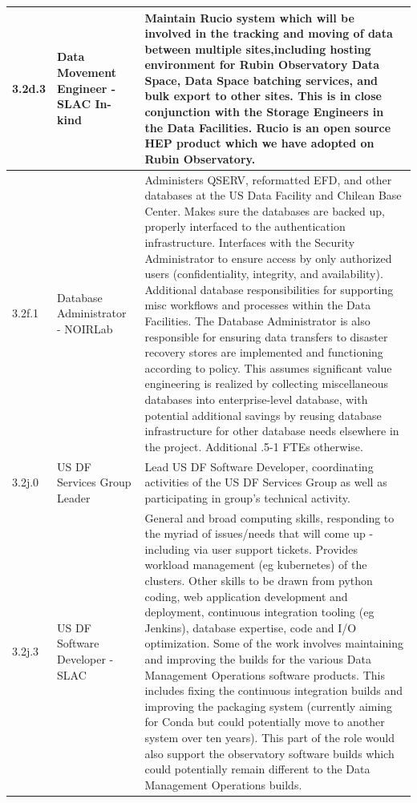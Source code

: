 \begin{longtable} {|p{}|p{}|p{}|}
{3.2d.3}&{Data Movement Engineer - SLAC In-kind}&{Maintain Rucio system which will be involved in the tracking and moving of data between multiple sites,including hosting environment for Rubin Observatory Data Space, Data Space batching services, and bulk export to other sites. This is in close conjunction with the Storage Engineers in the Data Facilities. Rucio is an open source HEP product which we have adopted on Rubin Observatory.} \\ \hline
{3.2f.1}&{Database Administrator - NOIRLab}&{Administers QSERV, reformatted EFD, and other databases at the US Data Facility and Chilean Base Center. Makes sure the databases are backed up, properly interfaced to the authentication infrastructure. Interfaces with the Security Administrator to ensure access by only authorized users (confidentiality, integrity, and availability). Additional database responsibilities for supporting misc workflows and processes within the Data Facilities. The Database Administrator is also responsible for ensuring data transfers to disaster recovery stores are implemented and functioning according to policy. This assumes significant value engineering is realized by collecting miscellaneous databases into enterprise-level database, with potential additional savings by reusing database infrastructure for other database needs elsewhere in the project. Additional .5-1 FTEs otherwise.} \\ \hline
{3.2j.0}&{US DF Services Group Leader}&{Lead US DF Software Developer, coordinating activities of the US DF Services Group as well as participating in group's technical activity.} \\ \hline
{3.2j.3}&{US DF Software Developer - SLAC}&{General and broad computing skills, responding to the myriad of issues/needs that will come up - including via user support tickets. Provides workload management (eg kubernetes) of the clusters. Other skills to be drawn from python coding, web application development and deployment, continuous integration tooling (eg Jenkins), database expertise, code and I/O optimization. Some of the work involves maintaining and improving the builds for the various Data Management Operations software products. This includes fixing the continuous integration builds and improving the packaging system (currently aiming for Conda but could potentially move to another system over ten years). This part of the role would also support the observatory software builds which could potentially remain different to the Data Management Operations builds.} \\ \hline

\end{longtable}
